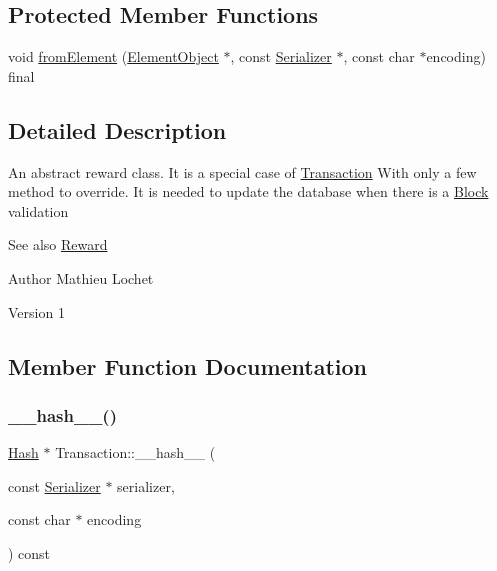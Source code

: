 \subsection*{Protected Member Functions}
\begin{DoxyCompactItemize}
\item 
void \mbox{\hyperlink{classReward_a6d16e21b60b7f11c7aaf0098a53118a2}{from\+Element}} (\mbox{\hyperlink{classElementObject}{Element\+Object}} $\ast$, const \mbox{\hyperlink{classSerializer}{Serializer}} $\ast$, const char $\ast$encoding) final
\end{DoxyCompactItemize}


\subsection{Detailed Description}
An abstract reward class. It is a special case of \mbox{\hyperlink{classTransaction}{Transaction}} With only a few method to override. It is needed to update the database when there is a \mbox{\hyperlink{classBlock}{Block}} validation \begin{DoxySeeAlso}{See also}
\mbox{\hyperlink{classReward}{Reward}}
\end{DoxySeeAlso}
\begin{DoxyAuthor}{Author}
Mathieu Lochet 
\end{DoxyAuthor}
\begin{DoxyVersion}{Version}
1 
\end{DoxyVersion}


\subsection{Member Function Documentation}
\mbox{\label{classTransaction_a1f0df166c34d6a38a991544cf98c0356}} 
\subsubsection{\texorpdfstring{\+\_\+\+\_\+hash\+\_\+\+\_\+()}{\_\_hash\_\_()}}
{\footnotesize\ttfamily \mbox{\hyperlink{classHash}{Hash}} $\ast$ Transaction\+::\+\_\+\+\_\+hash\+\_\+\+\_\+ (\begin{DoxyParamCaption}\item[{const \mbox{\hyperlink{classSerializer}{Serializer}} $\ast$}]{serializer,  }\item[{const char $\ast$}]{encoding }\end{DoxyParamCaption}) const\hspace{0.3cm}{\ttfamily [inherited]}}

